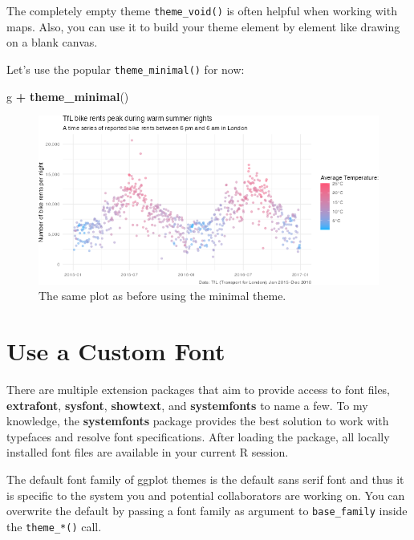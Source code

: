 \documentclass[
]{krantz}
\makeatletter
\newenvironment{Shaded}{\begin{snugshade}}{\end{snugshade}}
\newcommand{\FunctionTok}[1]{\textcolor[rgb]{0.27,0.27,0.27}{\textbf{#1}}}
\newcommand{\NormalTok}[1]{#1}
\newcommand{\SpecialCharTok}[1]{\textcolor[rgb]{0.43,0.43,0.43}{\textbf{#1}}}
\newenvironment{kframe}{%
\medskip{}
\setlength{\fboxsep}{.8em}
 \def\at@end@of@kframe{}%
 \ifinner\ifhmode%
  \def\at@end@of@kframe{\end{minipage}}%
  \begin{minipage}{\columnwidth}%
 \fi\fi%
 \def\FrameCommand##1{\hskip\@totalleftmargin \hskip-\fboxsep
 \colorbox{shadecolor}{##1}\hskip-\fboxsep
     \hskip-\linewidth \hskip-\@totalleftmargin \hskip\columnwidth}%
 \MakeFramed {\advance\hsize-\width
   \@totalleftmargin\z@ \linewidth\hsize
   \@setminipage}}%
 {\par\unskip\endMakeFramed%
 \at@end@of@kframe}
\renewenvironment{Shaded}{\begin{kframe}}{\end{kframe}}
\makeatother
\begin{document}
The completely empty theme \texttt{theme\_void()} is often helpful when working with maps. Also, you can use it to build your theme element by element like drawing on a blank canvas.

Let's use the popular \texttt{theme\_minimal()} for now:

\begin{Shaded}
\begin{Highlighting}[]
\NormalTok{g }\SpecialCharTok{+} \FunctionTok{theme\_minimal}\NormalTok{()}
\end{Highlighting}
\end{Shaded}

\begin{figure}
\centering
\includegraphics{bookdown_files/figure-latex/05themeMinimal-1.png}
\caption{\label{fig:05themeMinimal}The same plot as before using the minimal theme.}
\end{figure}

\hypertarget{use-a-custom-font}{%
\section{Use a Custom Font}\label{use-a-custom-font}}

There are multiple extension packages that aim to provide access to font files, \textbf{extrafont}, \textbf{sysfont}, \textbf{showtext}, and \textbf{systemfonts} to name a few. To my knowledge, the \textbf{systemfonts} package provides the best solution to work with typefaces and resolve font specifications. After loading the package, all locally installed font files are available in your current R session.

The default font family of ggplot themes is the default sans serif font and thus it is specific to the system you and potential collaborators are working on. You can overwrite the default by passing a font family as argument to \texttt{base\_family} inside the \texttt{theme\_*()} call.
\end{document}

